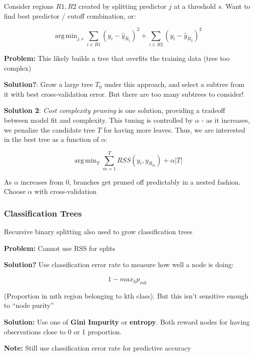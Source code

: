 \documentclass{article}
\DeclareMathOperator*{\argmin}{arg\,min}
\begin{document}
Consider regions $R1, R2$ created by splitting predictor $j$ at a threshold $s$. Want to find best predictor / cutoff combination, or:

\begin{equation*}
	\argmin_{j, s} \sum_{i \in R1} (y_i - \hat{y}_{R_1})^2 + \sum_{i \in R2} (y_i - \hat{y}_{R_2})^2
\end{equation*}

\textbf{Problem:} This likely builds a tree that overfits the training data (tree too complex)

\textbf{Solution?}: Grow a large tree $T_0$ under this approach, and select a subtree from it with best cross-validation error. But there are too many subtrees to consider!

\textbf{Solution 2}: \textit{Cost complexity pruning} is one solution, providing a tradeoff between model fit and complexity. This tuning is controlled by $\alpha$ - as it increases, we penalize the candidate tree $T$ for having more leaves. Thus, we are interested in the best tree as a function of $\alpha$:

\begin{equation*}
	\argmin_T \sum_{m=1}^T RSS(y_i, y_{R_m}) + \alpha |T|
\end{equation*}

As $\alpha$ increases from 0, branches get pruned off predictably in a nested fashion. Choose $\alpha$ with cross-validation


\subsubsection{Classification Trees}

Recursive binary splitting also used to grow classification trees

\textbf{Problem:} Cannot use RSS for splits

\textbf{Solution?} Use classification error rate to measure how well a node is doing:

\begin{equation*}
	1 - max_k p_{mk}
\end{equation*}

(Proportion in mth region belonging to kth class). But this isn't sensitive enough to ``node purity''

\textbf{Solution:} Use one of \textbf{Gini Impurity} or \textbf{entropy}. Both reward nodes for having observations close to 0 or 1 proportion.

\textbf{Note:} Still use classification error rate for predictive accuracy
\end{document}

